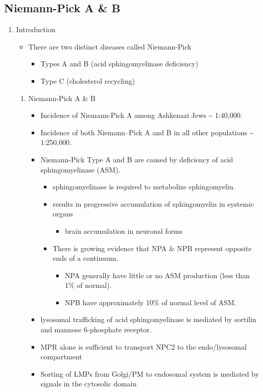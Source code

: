 \documentclass{scrartcl}
\begin{document}
\subsection{Niemann-Pick  A \& B}
\label{sec:org9f4232d}
\begin{enumerate}
\item Introduction
\label{sec:org787d9d8}
\begin{itemize}
\item There are two distinct diseases called Niemann-Pick
\begin{itemize}
\item Types A and B (acid sphingomyelinase deficiency)
\item Type C (cholesterol recycling)
\end{itemize}
\end{itemize}

\begin{enumerate}
\item Niemann-Pick A \& B
\label{sec:org2aa7a28}
\begin{itemize}
\item Incidence of Niemann-Pick A among Ashkenazi Jews \textasciitilde{} 1:40,000.
\item Incidence of both Niemann–Pick A and B in all other populations \textasciitilde{} 1:250,000.
\item Niemann-Pick Type A and B are caused by deficiency of acid sphingomyelinase (ASM).
\begin{itemize}
\item sphingomyelinase is required to metabolize sphingomyelin.
\item results in progressive accumulation of sphingomyelin in systemic organs
\begin{itemize}
\item brain accumulation in neuronal forms
\end{itemize}
\item There is growing evidence that NPA \& NPB represent opposite ends of a continuum.
\begin{itemize}
\item NPA generally have little or no ASM production (less than 1\% of normal).
\item NPB have approximately 10\% of normal level of ASM.
\end{itemize}
\end{itemize}
\item lysosomal trafficking of acid sphingomyelinase is mediated by sortilin and mannose 6-phosphate receptor.
\item MPR alone is sufficient to transport NPC2 to the endo/lysosomal compartment
\item Sorting of LMPs from Golgi/PM to endosomal system is mediated by
signals in the cytosolic domain
\end{itemize}


\end{enumerate}
\end{enumerate}
\end{document}
